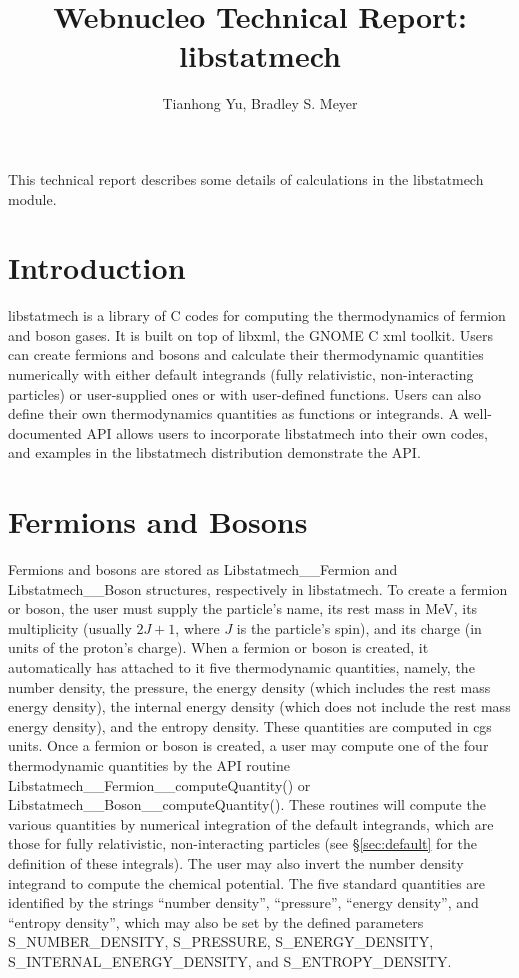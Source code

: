 \documentclass{article}    %
\title{Webnucleo Technical Report: libstatmech}  %
\author{Tianhong Yu, Bradley S. Meyer}
\begin{document}

\maketitle                 %


This technical report describes some details of calculations in the
libstatmech module.

\section{Introduction}

libstatmech is a library of C codes for computing the thermodynamics of
fermion and boson gases.  It is built on top of libxml, the GNOME C xml toolkit.
Users can create fermions and bosons and calculate their thermodynamic quantities
numerically with either default integrands (fully relativistic, non-interacting
particles) or user-supplied ones or with user-defined functions.  Users
can also define their own thermodynamics quantities as functions or integrands.
A well-documented API allows users to incorporate libstatmech into their
own codes, and examples in the libstatmech distribution demonstrate the API.

\section{Fermions and Bosons}

Fermions and bosons are stored as Libstatmech\_\_Fermion and
Libstatmech\_\_Boson structures, respectively in libstatmech.  To create a
fermion or boson, the user must supply the particle's name, its rest mass
in MeV, its multiplicity (usually $2J+1$, where $J$ is the particle's spin),
and its charge (in units of the proton's charge).  When a fermion or boson
is created, it automatically has attached to it five thermodynamic quantities,
namely, the number density, the pressure, the energy density (which
includes the rest mass energy density), the internal energy density
(which does not include the rest mass energy density), and the
entropy density.  These quantities are computed in cgs units.  Once a fermion
or boson is created, a user may compute one of the four thermodynamic
quantities by the API routine Libstatmech\_\_Fermion\_\_computeQuantity()
or Libstatmech\_\_Boson\_\_computeQuantity().  These routines will compute
the various quantities by numerical integration of the default integrands,
which are those for fully relativistic, non-interacting particles (see
\S \ref{sec:default} for the definition of these integrals).  The
user may also invert the number density integrand to compute the chemical
potential.  The five standard quantities are identified by the strings
``number density'', ``pressure'', ``energy density'', and ``entropy density'',
which may also be set by the defined parameters S\_NUMBER\_DENSITY,
S\_PRESSURE, S\_ENERGY\_DENSITY, S\_INTERNAL\_ENERGY\_DENSITY,
and S\_ENTROPY\_DENSITY.
\end{document}
